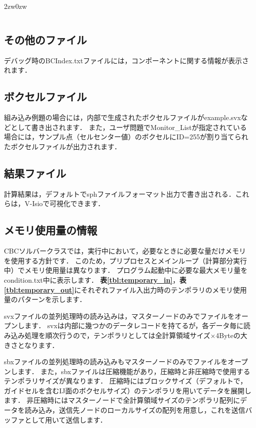 \begin{indentation}{2zw}{0zw}
\begin{table}[htdp]
\begin{center}
\begin{tabular}{ll}
\end{tabular}
\end{center}
\label{tbl:timing_label}
\end{table}

\end{indentation}

%
\pagebreak
\subsection{その他のファイル}
デバッグ時のBCIndex.txtファイルには，コンポーネントに関する情報が表示されます．

%
\pagebreak
\subsection{ボクセルファイル}
\label{sec:generated_voxel}
組み込み例題の場合には，内部で生成されたボクセルファイルがexample.svxなどとして書き出されます．
また，ユーザ問題でMonitor\_Listが指定されている場合には，サンプル点（セルセンター値）のボクセルにID=255が割り当てられたボクセルファイルが出力されます．

%
\pagebreak
\subsection{結果ファイル}

計算結果は，デフォルトでsphファイルフォーマット出力で書き出される．これらは，V-Isioで可視化できます．


%
\pagebreak
\subsection{メモリ使用量の情報}
\label{sec:memory_req}
CBCソルバークラスでは，実行中において，必要なときに必要な量だけメモリを使用する方針です．
このため，プリプロセスとメインループ（計算部分実行中）でメモリ使用量は異なります．
プログラム起動中に必要な最大メモリ量をcondition.txt中に表示します．
\textbf{表\ref{tbl:temporary_in}}，\textbf{表\ref{tbl:temporary_out}}にそれぞれファイル入出力時のテンポラリのメモリ使用量のパターンを示します．

svxファイルの並列処理時の読み込みは，マスターノードのみでファイルをオープンします．
svxは内部に幾つかのデータレコードを持てるが，各データ毎に読み込み処理を順次行うので，テンポラリとしては全計算領域サイズ$\times$4Byteの大きさとなります．

sbxファイルの並列処理時の読み込みもマスターノードのみでファイルをオープンします．
また，sbxファイルは圧縮機能があり，圧縮時と非圧縮時で使用するテンポラリサイズが異なります．
圧縮時にはブロックサイズ（デフォルトで，ガイドセルを含むIJ面のボクセルサイズ）のテンポラリを用いてデータを展開します．
非圧縮時にはマスターノードで全計算領域サイズのテンポラリ配列にデータを読み込み，送信先ノードのローカルサイズの配列を用意し，これを送信バッファとして用いて送信します．

